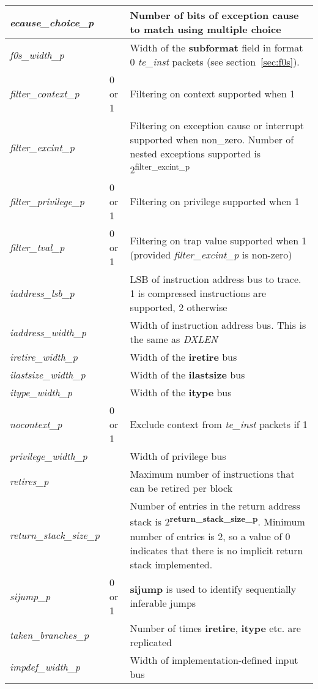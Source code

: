 \begin{table}[h]
\begin{tabulary}{\textwidth}{|l|l|p{100mm}|}
        \textit{ecause\_choice\_p} & & Number of bits of exception cause to match using multiple choice \\
        \hline
        \textit{f0s\_width\_p} & & Width of the \textbf{subformat} field in format 0 \textit{te\_inst} packets (see section~\ref{sec:f0s}). \\
        \hline
        \textit{filter\_context\_p} & 0 or 1 & Filtering on context supported when 1 \\
        \hline
        \textit{filter\_excint\_p} & & Filtering on exception cause or interrupt supported when non\_zero.  Number of nested exceptions supported is 2\textsuperscript{filter\_excint\_p} \\
        \hline
        \textit{filter\_privilege\_p} & 0 or 1 & Filtering on privilege supported when 1 \\
        \hline
        \textit{filter\_tval\_p} & 0 or 1 & Filtering on trap value supported when 1 (provided \textit{filter\_excint\_p} is non-zero) \\
        \hline
        \textit{iaddress\_lsb\_p} & & LSB of instruction address bus to trace.  1 is compressed instructions are supported, 2 otherwise\\
        \hline
        \textit{iaddress\_width\_p} & & Width of instruction address bus. This is the same as \textit{DXLEN}\\
        \hline
        \textit{iretire\_width\_p} & & Width of the \textbf{iretire} bus\\
        \hline
        \textit{ilastsize\_width\_p} & & Width of the \textbf{ilastsize} bus\\
        \hline
        \textit{itype\_width\_p} & & Width of the \textbf{itype} bus\\
        \hline
        \textit{nocontext\_p} & 0 or 1 & Exclude context from \textit{te\_inst} packets if 1 \\
        \hline
        \textit{privilege\_width\_p} & & Width of privilege bus \\
        \hline
        \textit{retires\_p} &  & Maximum number of instructions that can be retired per block \\
        \hline
        \textit{return\_stack\_size\_p} &  & Number of entries in the return address stack is 2\textsuperscript{\textbf{return\_stack\_size\_p}}.
                                    Minimum number of entries is 2, so a value of 0 indicates that there is no implicit return stack implemented.\\
        \hline
        \textit{sijump\_p} & 0 or 1 & \textbf{sijump} is used to identify sequentially inferable jumps\\
        \hline
        \textit{taken\_branches\_p} & & Number of times \textbf{iretire}, \textbf{itype} etc. are replicated\\
        \hline
        \textit{impdef\_width\_p} & & Width of implementation-defined input bus \\
        \hline
    \end{tabulary}
\end{table}
\FloatBarrier


